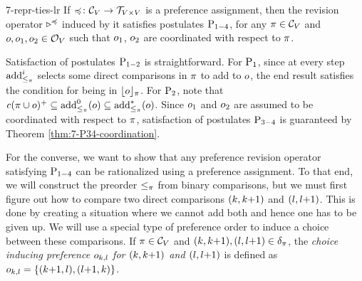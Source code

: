 \begin{thm}{}{7-repr-ties-lr}
	If $\preccurlyeq\colon\mathcal{C}_V\rightarrow\mathcal{T}_{V\times V}$ is a preference assignment,
	then the revision operator $\triangleright^\preccurlyeq$ induced by it satisfies postulates $\mathrm{P}_{1-4}$,
	for any $\pi\in\mathcal{C}_V$ and $o,o_1,o_2\in\mathcal{O}_V$ such that $o_1$, $o_2$ are coordinated 
	with respect to $\pi$.
\end{thm}
\begin{prf*}{}{}%
	Satisfaction of postulates $\mathrm{P}_{1-2}$ is straightforward.
	For $\mathrm{P}_{1}$, since at every step ${\operatorname{add}}^i_{\le_\pi}$ 
	selects some direct comparisons in $\pi$ to add to $o$,
	the end result satisfies the condition for being in $\lfloor{o}\rfloor_\pi$.
	For $\mathrm{P}_{2}$, note that 
	$\mathit{c}(\pi\cup o)^+\subseteq{\operatorname{add}}^0_{\le_\pi}(o)\subseteq{\operatorname{add}}_{\le_\pi}^\ast(o)$.
	Since $o_1$ and $o_2$ are assumed to be coordinated with respect to $\pi$, 
	satisfaction of postulates $\mathrm{P}_{3-4}$ 
	is guaranteed by Theorem \ref{thm:7-P34-coordination}.	
\end{prf*}

For the converse, we want to show that any preference revision operator satisfying $\mathrm{P}_{1-4}$
can be rationalized using a preference assignment.
To that end, we will construct the preorder $\le_\pi$ from binary comparisons,
but we must first figure out how to compare two direct comparisons $({k},{k}{+}{1})$ and $({l},{l}{+}{1})$.
This is done by creating a situation where we cannot add both and hence one has to be given up.
We will use a special type of preference order to induce a choice between these comparisons.
If $\pi\in\mathcal{C}_V$ and $({k},{k}{+}{1}),({l},{l}{+}{1})\in\delta_\pi$,
the \emph{choice inducing preference $o_{k,l}$ for $({k},{k}{+}{1})$ and $({l},{l}{+}{1})$} is
defined as $o_{k,l}=\{({k}{+}{1},l),(l{+}1, k)\}$.

